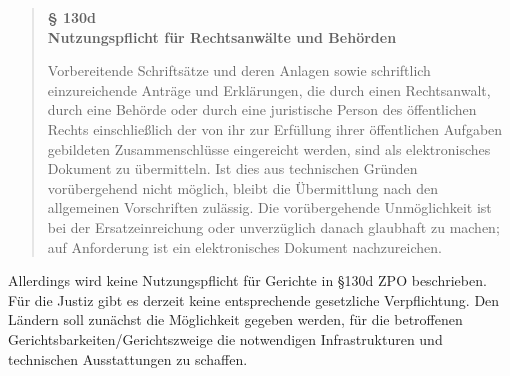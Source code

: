 \begin{quote}
	\begin{center}
		\textbf{§ 130d} \\
		\textbf{Nutzungspflicht für Rechtsanwälte und Behörden}
	\end{center}
	Vorbereitende Schriftsätze und deren Anlagen sowie schriftlich einzureichende Anträge und Erklärungen, die durch einen Rechtsanwalt, durch eine Behörde oder durch eine juristische Person des öffentlichen Rechts einschließlich der von ihr zur Erfüllung ihrer öffentlichen Aufgaben gebildeten Zusammenschlüsse eingereicht werden, sind als elektronisches Dokument zu übermitteln. Ist dies aus technischen Gründen vorübergehend nicht möglich, bleibt die Übermittlung nach den allgemeinen Vorschriften zulässig. Die vorübergehende Unmöglichkeit ist bei der Ersatzeinreichung oder unverzüglich danach glaubhaft zu machen; auf Anforderung ist ein elektronisches Dokument nachzureichen.
\end{quote}

Allerdings wird keine Nutzungspflicht für Gerichte in §130d ZPO \cite{bea:bea:zpo130} beschrieben. Für die Justiz gibt es derzeit keine entsprechende gesetzliche Verpflichtung. Den Ländern soll zunächst die Möglichkeit gegeben werden, für die betroffenen Gerichtsbarkeiten/Gerichtszweige die notwendigen Infrastrukturen und technischen Ausstattungen zu schaffen.

